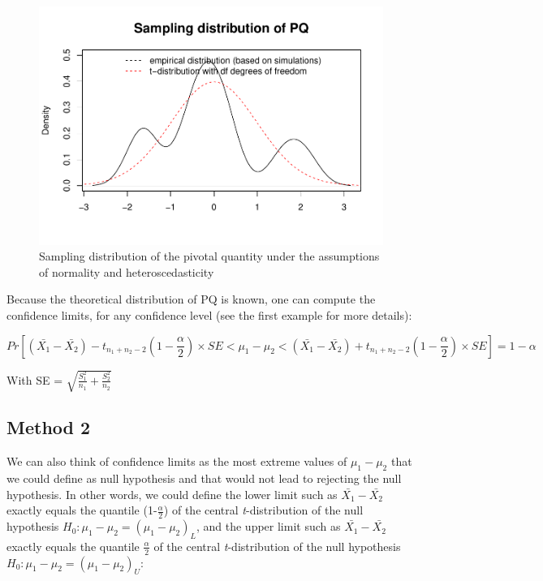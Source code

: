 \documentclass[man,floatsintext]{apa6}
\begin{document}
\begin{figure}
\centering
\includegraphics{CI-Reminder_files/figure-latex/SAMPLMEANDIFF2-1.pdf}
\caption{\label{fig:SAMPLMEANDIFF2}Sampling distribution of the pivotal quantity under the assumptions of normality and heteroscedasticity}
\end{figure}

Because the theoretical distribution of PQ is known, one can compute the confidence limits, for any confidence level (see the first example for more details):

\begin{equation} 
Pr[(\bar{X_1}-\bar{X_2}) - t_{n_1+n_2-2}(1-\frac{\alpha}{2}) \times SE < \mu_1-\mu_2 <(\bar{X_1}-\bar{X_2}) +t_{n_1+n_2-2}(1-\frac{\alpha}{2}) \times SE]= 1- \alpha
\label{eq:conflev6}
\end{equation}

With SE = \(\sqrt{\frac{S_1^2}{n_1}+\frac{S_2^2}{n_2}}\)

\hypertarget{method-2}{%
\subsection{Method 2}\label{method-2}}

We can also think of confidence limits as the most extreme values of \(\mu_1-\mu_2\) that we could define as null hypothesis and that would not lead to rejecting the null hypothesis. In other words, we could define the lower limit such as \(\bar{X_1}-\bar{X_2}\) exactly equals the quantile (1-\(\frac{\alpha}{2}\)) of the central \emph{t}-distribution of the null hypothesis \(H_0: \mu_1 - \mu_2 = (\mu_1-\mu_2)_L\), and the upper limit such as \(\bar{X_1}-\bar{X_2}\) exactly equals the quantile \(\frac{\alpha}{2}\) of the central \emph{t}-distribution of the null hypothesis \(H_0: \mu_1 - \mu_2 = (\mu_1-\mu_2)_U\):
\end{document}
